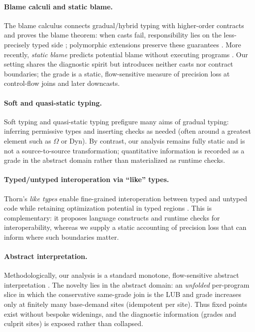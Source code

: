 \paragraph{Blame calculi and static blame.}
The blame calculus connects gradual/hybrid typing with higher-order contracts and proves the blame theorem: when casts fail, responsibility lies on the less-precisely typed side \cite{WadlerFindler2009}; polymorphic extensions preserve these guarantees \cite{AhmedFindlerSiekWadler2011}. More recently, \emph{static blame} predicts potential blame without executing programs \cite{SuCulpepper2024}. Our setting shares the diagnostic spirit but introduces neither casts nor contract boundaries; the grade is a static, flow-sensitive measure of precision loss at control-flow joins and later downcasts.

\paragraph{Soft and quasi-static typing.}
Soft typing \cite{CartwrightFagan1991} and quasi-static typing \cite{Thatte1990} prefigure many aims of gradual typing: inferring permissive types and inserting checks as needed (often around a greatest element such as $\Omega$ or \textsf{Dyn}). By contrast, our analysis remains fully static and is not a source-to-source transformation; quantitative information is recorded as a grade in the abstract domain rather than materialized as runtime checks.

\paragraph{Typed/untyped interoperation via ``like'' types.}
Thorn’s \emph{like types} enable fine-grained interoperation between typed and untyped code while retaining optimization potential in typed regions \cite{WrigstadEtAl2010}. This is complementary: it proposes language constructs and runtime checks for interoperability, whereas we supply a static accounting of precision loss that can inform where such boundaries matter.

\paragraph{Abstract interpretation.}
Methodologically, our analysis is a standard monotone, flow-sensitive abstract interpretation \cite{CousotCousot1977}. The novelty lies in the abstract domain: an \emph{unfolded} per-program slice in which the conservative same-grade join is the LUB and grade increases only at finitely many base-demand sites (idempotent per site). Thus fixed points exist without bespoke widenings, and the diagnostic information (grades and culprit sites) is exposed rather than collapsed.

